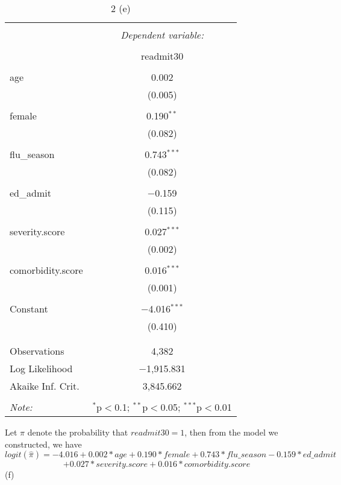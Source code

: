 \documentclass[
]{article}
\begin{document}
\begin{table}[!htbp] \centering 
  \caption{2 (e)} 
  \label{} 
\begin{tabular}{@{\extracolsep{5pt}}lc} 
\\[-1.8ex]\hline 
\hline \\[-1.8ex] 
 & \multicolumn{1}{c}{\textit{Dependent variable:}} \\ 
\cline{2-2} 
\\[-1.8ex] & readmit30 \\ 
\hline \\[-1.8ex] 
 age & 0.002 \\ 
  & (0.005) \\ 
  & \\ 
 female & 0.190$^{**}$ \\ 
  & (0.082) \\ 
  & \\ 
 flu\_season & 0.743$^{***}$ \\ 
  & (0.082) \\ 
  & \\ 
 ed\_admit & $-$0.159 \\ 
  & (0.115) \\ 
  & \\ 
 severity.score & 0.027$^{***}$ \\ 
  & (0.002) \\ 
  & \\ 
 comorbidity.score & 0.016$^{***}$ \\ 
  & (0.001) \\ 
  & \\ 
 Constant & $-$4.016$^{***}$ \\ 
  & (0.410) \\ 
  & \\ 
\hline \\[-1.8ex] 
Observations & 4,382 \\ 
Log Likelihood & $-$1,915.831 \\ 
Akaike Inf. Crit. & 3,845.662 \\ 
\hline 
\hline \\[-1.8ex] 
\textit{Note:}  & \multicolumn{1}{r}{$^{*}$p$<$0.1; $^{**}$p$<$0.05; $^{***}$p$<$0.01} \\ 
\end{tabular} 
\end{table}

Let \(\pi\) denote the probability that \(readmit30=1\), then from the
model we constructed, we have
\[logit(\hat{\pi})=-4.016+0.002*age+0.190*female+0.743*flu\_season-0.159*ed\_admit\]
\[+0.027*severity.score+0.016*comorbidity.score\] (f)
\end{document}

